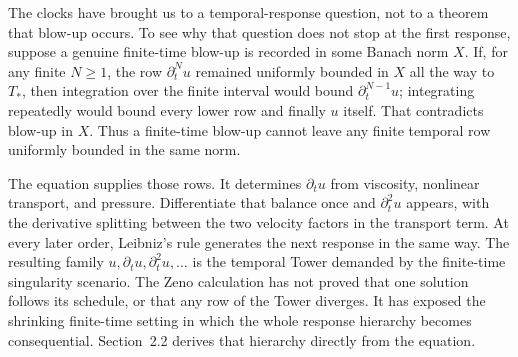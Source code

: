 The clocks have brought us to a temporal-response question, not to a theorem that blow-up occurs.
To see why that question does not stop at the first response, suppose a genuine finite-time blow-up is recorded in some Banach norm \(X\).
If, for any finite \(N\geq1\), the row \(\partial_t^N u\) remained uniformly bounded in \(X\) all the way to \(T_*\), then integration over the finite interval would bound \(\partial_t^{N-1}u\); integrating repeatedly would bound every lower row and finally \(u\) itself.
That contradicts blow-up in \(X\).
Thus a finite-time blow-up cannot leave any finite temporal row uniformly bounded in the same norm.

The \NavierStokes{} equation supplies those rows.
It determines \(\partial_tu\) from viscosity, nonlinear transport, and pressure.
Differentiate that balance once and \(\partial_t^2u\) appears, with the derivative splitting between the two velocity factors in the transport term.
At every later order, Leibniz's rule generates the next response in the same way.
The resulting family \(u,\partial_tu,\partial_t^2u,\ldots\) is the temporal Tower demanded by the finite-time singularity scenario.
The Zeno calculation has not proved that one solution follows its schedule, or that any row of the Tower diverges.
It has exposed the shrinking finite-time setting in which the whole response hierarchy becomes consequential.
Section~2.2 derives that hierarchy directly from the equation.

